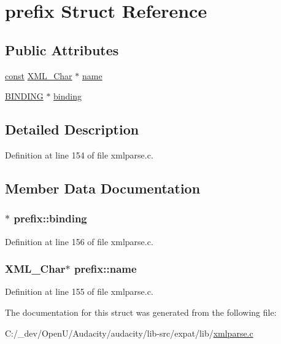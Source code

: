 \hypertarget{structprefix}{}\section{prefix Struct Reference}
\label{structprefix}
\subsection*{Public Attributes}
\begin{DoxyCompactItemize}
\item 
\hyperlink{getopt1_8c_a2c212835823e3c54a8ab6d95c652660e}{const} \hyperlink{amiga_2include_2libraries_2expat_8h_a63da96463e775e1ec3a7d1f076208127}{X\+M\+L\+\_\+\+Char} $\ast$ \hyperlink{structprefix_a4510490e44627ec26931c7f72ba6d7f0}{name}
\item 
\hyperlink{xmlparse_8c_a243b660be2393a4a7269d15d76c5fc15}{B\+I\+N\+D\+I\+NG} $\ast$ \hyperlink{structprefix_ad3653583a89398f449bd37eaf6de3f22}{binding}
\end{DoxyCompactItemize}


\subsection{Detailed Description}


Definition at line 154 of file xmlparse.\+c.



\subsection{Member Data Documentation}
\subsubsection[{\texorpdfstring{binding}{binding}}]{$\ast$ prefix\+::binding}\hypertarget{structprefix_ad3653583a89398f449bd37eaf6de3f22}{}\label{structprefix_ad3653583a89398f449bd37eaf6de3f22}


Definition at line 156 of file xmlparse.\+c.

\subsubsection[{\texorpdfstring{name}{name}}]{ {\bf X\+M\+L\+\_\+\+Char}$\ast$ prefix\+::name}\hypertarget{structprefix_a4510490e44627ec26931c7f72ba6d7f0}{}\label{structprefix_a4510490e44627ec26931c7f72ba6d7f0}


Definition at line 155 of file xmlparse.\+c.



The documentation for this struct was generated from the following file\+:\begin{DoxyCompactItemize}
\item 
C\+:/\+\_\+dev/\+Open\+U/\+Audacity/audacity/lib-\/src/expat/lib/\hyperlink{xmlparse_8c}{xmlparse.\+c}\end{DoxyCompactItemize}
